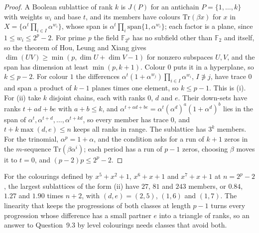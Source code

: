 \begin{proof}
A Boolean sublattice of rank $k$ is $J(P)$ for an antichain $P=\{1,\dots,k\}$ with weights $w_{i}$ and base $t$, and its members have colours $\mathrm{Tr}(\beta x)$ for $x$ in $X=\{\alpha^{t}\prod_{i\in I}\alpha^{w_{i}}\}$, whose span is $\alpha^{t}\prod_{i}\mathrm{span}\{1,\alpha^{w_{i}}\}$; each factor is a plane, since $1\le w_{i}\le2^{p}-2$. For prime $p$ the field $\mathbb{F}_{2^{p}}$ has no subfield other than $\mathbb{F}_{2}$ and itself, so the theorem of Hou, Leung and Xiang \cite{HLX02} gives $\dim(UV)\ge\min(p,\dim U+\dim V-1)$ for nonzero subspaces $U,V$, and the span has dimension at least $\min(p,k+1)$. Colour $0$ puts it in a hyperplane, so $k\le p-2$. For colour $1$ the differences $\alpha^{t}(1+\alpha^{w_{j}})\prod_{i\in I}\alpha^{w_{i}}$, $I\not\ni j$, have trace $0$ and span a product of $k-1$ planes times one element, so $k\le p-1$. This is (i). For (ii) take $k$ disjoint chains, each with ranks $0$, $d$ and $e$. Their down-sets have ranks $t+ad+be$ with $a+b\le k$, and $\alpha^{t+ad+be}=\alpha^{t}(\alpha^{d})^{a}(1+\alpha^{d})^{b}$ lies in the span of $\alpha^{t},\alpha^{t+d},\dots,\alpha^{t+kd}$, so every member has trace $0$, and $t+k\max(d,e)\le n$ keeps all ranks in range. The sublattice has $3^{k}$ members. For the trinomial, $\alpha^{p}=1+\alpha$, and the condition asks for a run of $k+1$ zeros in the $m$-sequence $\mathrm{Tr}(\beta\alpha^{i})$; each period has a run of $p-1$ zeros, choosing $\beta$ moves it to $t=0$, and $(p-2)p\le2^{p}-2$.
\end{proof}

For the colourings defined by $x^{5}+x^{2}+1$, $x^{6}+x+1$ and $x^{7}+x+1$ at $n=2^{p}-2$, the largest sublattices of the form (ii) have $27$, $81$ and $243$ members, or $0.84$, $1.27$ and $1.90$ times $n+2$, with $(d,e)=(2,5)$, $(1,6)$ and $(1,7)$. The linearity that keeps the progressions of both classes at length $p-1$ turns every progression whose difference has a small partner $e$ into a triangle of ranks, so an answer to Question~9.3 by level colourings needs classes that avoid both.
